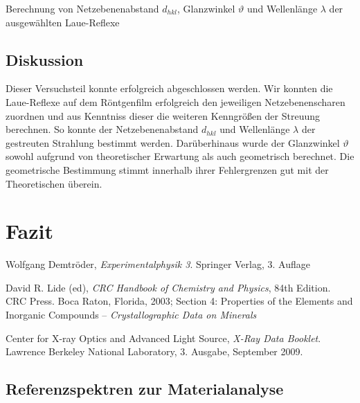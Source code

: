 \documentclass[11pt, a4paper]{article}
\begin{document}
\begin{table}[h]
\centering

\caption{Berechnung von Netzebenenabstand $d_{hkl}$, Glanzwinkel $\vartheta$ und Wellenlänge $\lambda$ der ausgewählten Laue-Reflexe}
\label{tab:laue_winkel}
\end{table}

\subsection{Diskussion}
Dieser Versuchsteil konnte erfolgreich abgeschlossen werden.
Wir konnten die Laue-Reflexe auf dem Röntgenfilm erfolgreich den jeweiligen Netzebenenscharen zuordnen und aus Kenntniss dieser die weiteren Kenngrößen der Streuung berechnen.
So konnte der Netzebenenabstand $d_{hkl}$ und Wellenlänge $\lambda$ der gestreuten Strahlung bestimmt werden.
Darüberhinaus wurde der Glanzwinkel $\vartheta$ sowohl aufgrund von theoretischer Erwartung als auch geometrisch berechnet.
Die geometrische Bestimmung stimmt innerhalb ihrer Fehlergrenzen gut mit der Theoretischen überein.


\section{Fazit}





\begin{thebibliography}{9}
	Wolfgang Demtröder,
	\emph{Experimentalphysik 3}.
	Springer Verlag,
	3. Auflage

  David R. Lide (ed),
  \emph{CRC Handbook of Chemistry and Physics},
  84th Edition. CRC Press. Boca Raton, Florida, 2003;
  Section 4: Properties of the Elements and Inorganic Compounds --
  \emph{Crystallographic Data on Minerals}

  Center for X-ray Optics and Advanced Light Source,
  \emph{X-Ray Data Booklet}.
  Lawrence Berkeley National Laboratory,
  3. Ausgabe,
  September 2009.
\end{thebibliography}

\newpage

\begin{appendix}
\section{Referenzspektren zur Materialanalyse}
\label{sec:referenzspektren}
\begin{figure}[h]
\centering
\resizebox{\columnwidth}{!}{%
}
\end{figure}

\begin{figure}[h]
\centering
\resizebox{\columnwidth}{!}{%
}
\end{figure}
\end{appendix}
\end{document}
